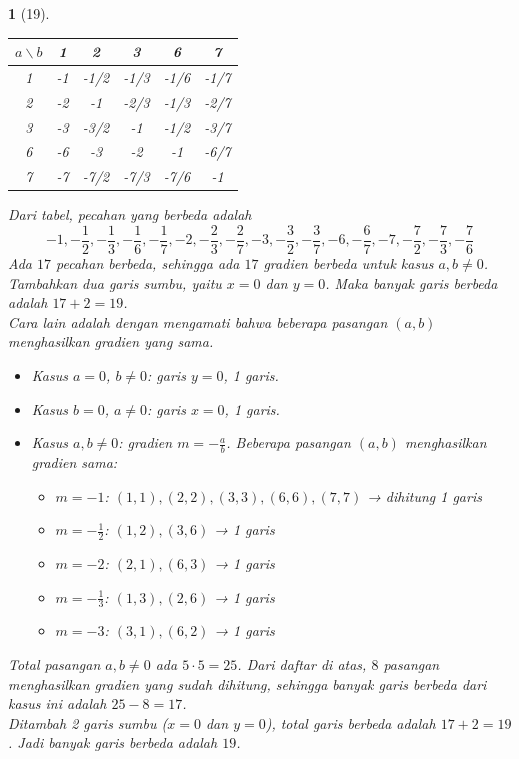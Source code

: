 \documentclass[11pt,a4paper,DIV=12]{scrartcl}
\theoremstyle{problemstyle}
\theoremstyle{answerstyle}
\newtheorem{answer}{}
\begin{document}
\begin{answer}[19]
  \begin{center}
    \begin{tabular}{c|ccccc}
      $a\backslash b$ & 1  & 2    & 3    & 6    & 7    \\
      \hline
      1               & -1 & -1/2 & -1/3 & -1/6 & -1/7 \\
      2               & -2 & -1   & -2/3 & -1/3 & -2/7 \\
      3               & -3 & -3/2 & -1   & -1/2 & -3/7 \\
      6               & -6 & -3   & -2   & -1   & -6/7 \\
      7               & -7 & -7/2 & -7/3 & -7/6 & -1
    \end{tabular}
  \end{center}
  Dari tabel, pecahan yang berbeda adalah
  \[
    -1, -\frac{1}{2}, -\frac{1}{3}, -\frac{1}{6}, -\frac{1}{7}, -2, -\frac{2}{3}, -\frac{2}{7}, -3, -\frac{3}{2}, -\frac{3}{7}, -6, -\frac{6}{7}, -7, -\frac{7}{2}, -\frac{7}{3}, -\frac{7}{6}
  \]
  Ada $17$ pecahan berbeda, sehingga ada $17$ gradien berbeda untuk kasus $a,b\neq 0$.
  Tambahkan dua garis sumbu, yaitu $x=0$ dan $y=0$. Maka banyak garis berbeda adalah $17+2=19$.\\
  Cara lain adalah dengan mengamati bahwa beberapa pasangan $(a,b)$ menghasilkan gradien yang sama.
  \begin{itemize}
    \item Kasus $a=0$, $b\neq 0$: garis $y=0$, 1 garis.
    \item Kasus $b=0$, $a\neq 0$: garis $x=0$, 1 garis.
    \item Kasus $a,b\neq 0$: gradien $m=-\frac{a}{b}$. Beberapa pasangan $(a,b)$ menghasilkan gradien sama:
          \begin{itemize}
            \item $m=-1$: $(1,1),(2,2),(3,3),(6,6),(7,7)$ → dihitung 1 garis
            \item $m=-\frac12$: $(1,2),(3,6)$ → 1 garis
            \item $m=-2$: $(2,1),(6,3)$ → 1 garis
            \item $m=-\frac13$: $(1,3),(2,6)$ → 1 garis
            \item $m=-3$: $(3,1),(6,2)$ → 1 garis
          \end{itemize}
  \end{itemize}
  Total pasangan $a,b\neq 0$ ada $5\cdot 5=25$. Dari daftar di atas, $8$ pasangan menghasilkan gradien yang sudah dihitung, sehingga banyak garis berbeda dari kasus ini adalah $25-8=17$. \\
  Ditambah 2 garis sumbu ($x=0$ dan $y=0$), total garis berbeda adalah $17+2=19$.
  Jadi banyak garis berbeda adalah $\boxed{19}$.
\end{answer}
\end{document}
